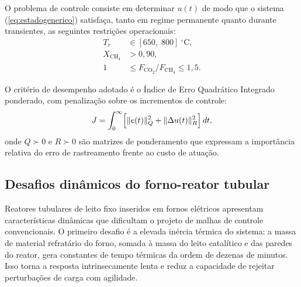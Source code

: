 O problema de controle consiste em determinar $u(t)$ de modo que o sistema
(\ref{eq:estadogenerico}) satisfaça, tanto em regime permanente quanto durante
transientes, as seguintes restrições operacionais:\citep{luyben2014,thermodynamics2025}
\begin{align}
  T_r &\in [650,\;800]~^\circ\text{C}, \label{eq:restr_T} \\
  X_{\mathrm{CH}_4} &> 0{,}90, \label{eq:restr_X} \\
  1 &\leq F_{\mathrm{CO}_2}/F_{\mathrm{CH}_4} \leq 1{,}5. \label{eq:restr_razao}
\end{align}

O critério de desempenho adotado é o Índice de Erro Quadrático Integrado
ponderado, com penalização sobre os incrementos de controle:
\begin{equation}
  J = \int_0^\infty \Bigl[\|e(t)\|_Q^2 + \|\Delta u(t)\|_R^2 \Bigr]\,dt,
  \label{eq:ISE}
\end{equation}
onde $Q \succ 0$ e $R \succ 0$ são matrizes de ponderamento que expressam
a importância relativa do erro de rastreamento frente ao custo de atuação.

\subsection{Desafios dinâmicos do forno-reator tubular}
\label{sec:desafios}

Reatores tubulares de leito fixo inseridos em fornos elétricos apresentam
características dinâmicas que dificultam o projeto de malhas de controle
convencionais.\citep{luyben2014} O primeiro desafio é a elevada inércia
térmica do sistema: a massa de material refratário do forno, somada à
massa do leito catalítico e das paredes do reator, gera constantes de tempo
térmicas da ordem de dezenas de minutos. Isso torna a resposta intrinsecamente
lenta e reduz a capacidade de rejeitar perturbações de carga com agilidade.\citep{luyben2014}

